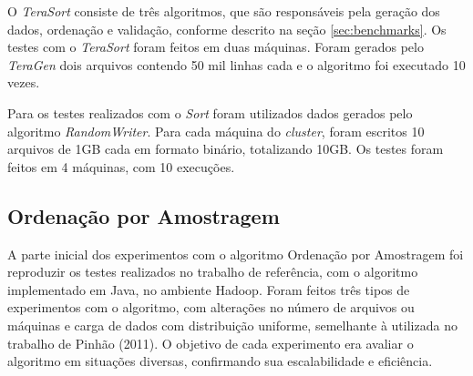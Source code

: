 
O \textit{TeraSort} consiste de três algoritmos, que são responsáveis pela geração dos dados, ordenação e validação, conforme descrito na seção \ref{sec:benchmarks}.
Os testes com o \textit{TeraSort} foram feitos em duas máquinas. Foram gerados pelo \textit{TeraGen} dois arquivos contendo 50 mil linhas cada e o algoritmo foi executado 10 vezes.

 



Para os testes realizados com o \textit{Sort} foram utilizados dados gerados pelo algoritmo \textit{RandomWriter}. Para cada máquina do \textit{cluster}, foram escritos 10 arquivos de 1GB cada em formato binário, totalizando 10GB. Os testes foram feitos em 4 máquinas, com 10 execuções. 


\subsection{Ordenação por Amostragem}

A parte inicial dos experimentos com o algoritmo Ordenação por Amostragem foi reproduzir os testes realizados no trabalho de referência, com o algoritmo implementado em Java, no ambiente Hadoop. 
Foram feitos três tipos de experimentos com o algoritmo, com alterações no número de arquivos ou máquinas e carga de dados com distribuição uniforme, semelhante à utilizada no trabalho de Pinhão (2011). 
O objetivo de cada experimento era avaliar o algoritmo em situações diversas, confirmando sua escalabilidade e eficiência.


